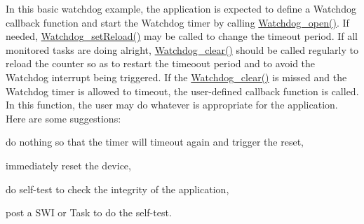 In this basic watchdog example, the application is expected to define a Watchdog callback function and start the Watchdog timer by calling \hyperlink{_watchdog_8h_aa5ce656aa6d5199e1efdb4ca2cd9fb7c}{Watchdog\+\_\+open()}. If needed, \hyperlink{_watchdog_8h_a476ef7b9d4e7268717adf94d8505f4a5}{Watchdog\+\_\+set\+Reload()} may be called to change the timeout period. If all monitored tasks are doing alright, \hyperlink{_watchdog_8h_a396decd6b1807db10c636f9987c3be4c}{Watchdog\+\_\+clear()} should be called regularly to reload the counter so as to restart the timeoout period and to avoid the Watchdog interrupt being triggered. If the \hyperlink{_watchdog_8h_a396decd6b1807db10c636f9987c3be4c}{Watchdog\+\_\+clear()} is missed and the Watchdog timer is allowed to timeout, the user-\/defined callback function is called. In this function, the user may do whatever is appropriate for the application. Here are some suggestions\+:
\begin{DoxyItemize}
\item do nothing so that the timer will timeout again and trigger the reset,
\item immediately reset the device,
\item do self-\/test to check the integrity of the application,
\item post a S\+W\+I or Task to do the self-\/test.
\end{DoxyItemize}

